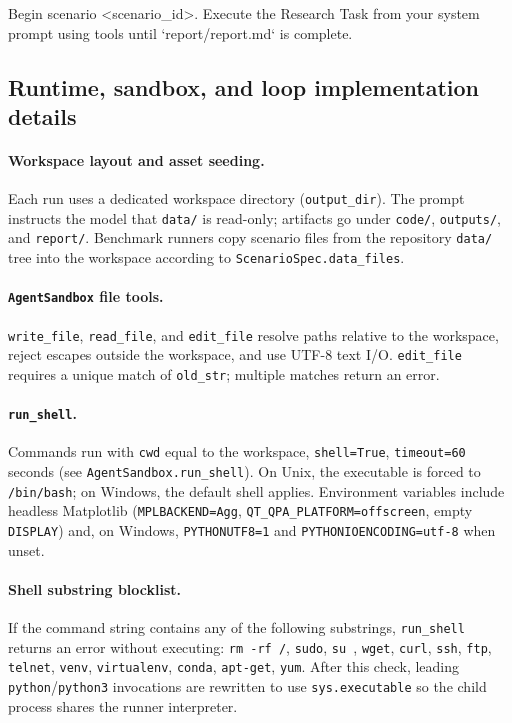 \begin{AgentDetails}
  \begin{PromptBlock}
  Begin scenario <scenario_id>. Execute the Research Task from your system prompt using tools until `report/report.md` is complete.
  \end{PromptBlock}
  
  \subsection{Runtime, sandbox, and loop implementation details}
  \label{app:agent_implementation_details}
  
  \paragraph{Workspace layout and asset seeding.}
  Each run uses a dedicated workspace directory (\texttt{output\_dir}). The prompt instructs the model that \texttt{data/} is read-only; artifacts go under \texttt{code/}, \texttt{outputs/}, and \texttt{report/}. Benchmark runners copy scenario files from the repository \texttt{data/} tree into the workspace according to \texttt{ScenarioSpec.data\_files}.
  
  \paragraph{\texttt{AgentSandbox} file tools.}
  \texttt{write\_file}, \texttt{read\_file}, and \texttt{edit\_file} resolve paths relative to the workspace, reject escapes outside the workspace, and use UTF-8 text I/O. \texttt{edit\_file} requires a unique match of \texttt{old\_str}; multiple matches return an error.
  
  \paragraph{\texttt{run\_shell}.}
  Commands run with \texttt{cwd} equal to the workspace, \texttt{shell=True}, \texttt{timeout=60} seconds (see \texttt{AgentSandbox.run\_shell}). On Unix, the executable is forced to \texttt{/bin/bash}; on Windows, the default shell applies. Environment variables include headless Matplotlib (\texttt{MPLBACKEND=Agg}, \texttt{QT\_QPA\_PLATFORM=offscreen}, empty \texttt{DISPLAY}) and, on Windows, \texttt{PYTHONUTF8=1} and \texttt{PYTHONIOENCODING=utf-8} when unset.
  
  \paragraph{Shell substring blocklist.}
  If the command string contains any of the following substrings, \texttt{run\_shell} returns an error without executing: \texttt{rm -rf /}, \texttt{sudo}, \texttt{su }, \texttt{wget}, \texttt{curl}, \texttt{ssh}, \texttt{ftp}, \texttt{telnet}, \texttt{venv}, \texttt{virtualenv}, \texttt{conda}, \texttt{apt-get}, \texttt{yum}. After this check, leading \texttt{python}/\texttt{python3} invocations are rewritten to use \texttt{sys.executable} so the child process shares the runner interpreter.
  

\end{AgentDetails}
